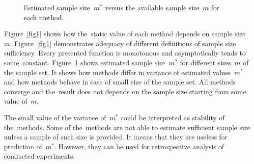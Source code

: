 \documentclass[
11pt,%
tightenlines,%
twoside,%
onecolumn,%
nofloats,%
nobibnotes,%
nofootinbib,%
superscriptaddress,%
noshowpacs,%
centertags]%
{revtex4}
\begin{document}
\begin{figure}[!htp]
 \caption{Estimated sample size~$m^*$ versus the available sample size~$m$ for each method.}
\label{fig2}
\end{figure}

Figure~\ref{fig1} shows how the~static value of each method depends on sample size~$m$. %
Figure~\ref{fig1} demonstrates adequacy of different definitions of sample size sufficiency. Every presented function is monotonous and asymptotically tends to some~constant. Figure~\ref{fig2} shows estimated sample size~$m^*$ for  different sizes~$m$ of the sample set. It shows how methods differ in variance  of estimated values~$m^*$ and how methods behave in case of small size of the sample set. All methods converge and the~result does not depends on the sample size starting from some value of~$m$. 

The small value of the variance of~$m^*$ could be interpreted as stability of the~methods. 
Some of the~methods are not able to estimate sufficient sample size unless a sample of  such size is provided. It means that they are useless for prediction of~$m^*$. However, they can be used for retrospective analysis of conducted experiments.
\end{document}
